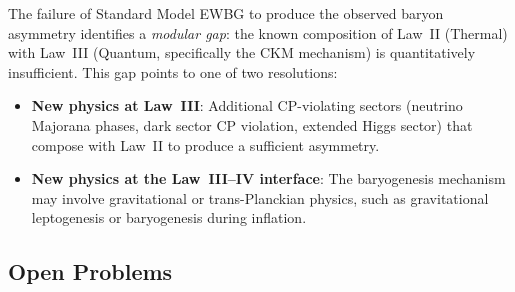 \documentclass[12pt]{article}
\theoremstyle{definition}
\theoremstyle{remark}
\begin{document}
The failure of Standard Model EWBG to produce the observed baryon asymmetry
identifies a \emph{modular gap}: the known composition of Law~II (Thermal) with
Law~III (Quantum, specifically the CKM mechanism) is quantitatively insufficient.
This gap points to one of two resolutions:

\begin{itemize}
    \item \textbf{New physics at Law~III}: Additional CP-violating sectors (neutrino
    Majorana phases, dark sector CP violation, extended Higgs sector) that compose
    with Law~II to produce a sufficient asymmetry.

    \item \textbf{New physics at the Law~III--IV interface}: The baryogenesis mechanism
    may involve gravitational or trans-Planckian physics, such as gravitational
    leptogenesis or baryogenesis during inflation.
\end{itemize}

\subsection{Open Problems}
\end{document}
